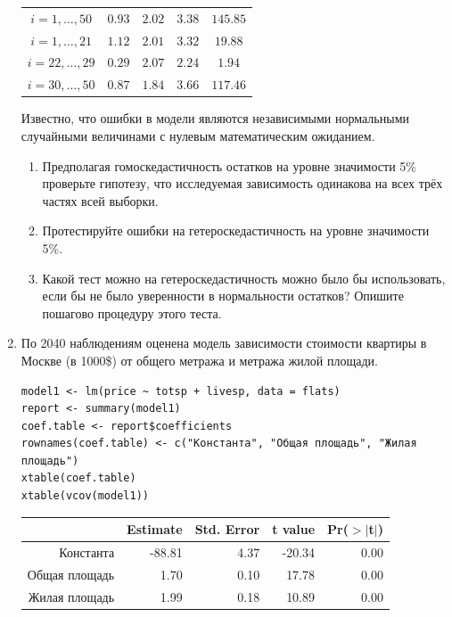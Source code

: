 \documentclass[12pt, a4paper]{article}
\begin{document}
\begin{enumerate}
\begin{tabular}{c|cccc}
\hline
$i=1,\ldots, 50$ & $0.93$ & $2.02$ & $3.38$ & $145.85$ \\
$i=1,\ldots, 21$ & $1.12$ & $2.01$ & $3.32$ & $19.88$ \\
$i=22,\ldots, 29$ & $0.29$ & $2.07$ & $2.24$ & $1.94$ \\
$i=30,\ldots, 50$ & $0.87$ & $1.84$ & $3.66$ & $117.46$ \\
\end{tabular}

Известно, что ошибки в модели являются независимыми нормальными случайными величинами с нулевым математическим ожиданием.

\begin{enumerate}
\item Предполагая гомоскедастичность остатков на уровне значимости 5\% проверьте гипотезу, что исследуемая зависимость одинакова на всех трёх частях всей выборки.
\item Протестируйте ошибки на гетероскедастичность на уровне значимости 5\%.
\item Какой тест можно на гетероскедастичность можно было бы использовать, если бы не было уверенности в нормальности остатков? Опишите пошагово процедуру этого теста.
\end{enumerate}


\item По 2040 наблюдениям оценена модель зависимости стоимости квартиры в Москве (в 1000\$) от общего метража и метража жилой площади.
\begin{verbatim}
model1 <- lm(price ~ totsp + livesp, data = flats)
report <- summary(model1)
coef.table <- report$coefficients
rownames(coef.table) <- c("Константа", "Общая площадь", "Жилая площадь")
xtable(coef.table)
xtable(vcov(model1))
\end{verbatim}

\begin{table}[ht]
\centering
\begin{tabular}{rrrrr}
  \hline
 & Estimate & Std. Error & t value & Pr($>$$|$t$|$) \\
  \hline
Константа & -88.81 & 4.37 & -20.34 & 0.00 \\
  Общая площадь & 1.70 & 0.10 & 17.78 & 0.00 \\
  Жилая площадь & 1.99 & 0.18 & 10.89 & 0.00 \\
   \hline
\end{tabular}
\end{table}


\end{enumerate}
\end{document}

